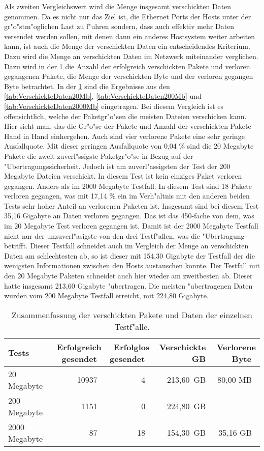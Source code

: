 Als zweiten Vergleichswert wird die Menge insgesamt verschickten Daten genommen. %
Da es nicht nur das Ziel ist, die Ethernet Ports der Hosts unter der gr"o"stm"oglichen %
Last zu f"uhren sondern, dass auch effektiv mehr Daten versendet werden sollen, mit denen dann ein anderes %
Hostsystem weiter arbeiten kann, ist auch die Menge der verschickten Daten ein entscheidendes Kriterium. Dazu wird die Menge an %
verschickten Daten im Netzwerk miteinander verglichen. Dazu wird in der \cref{tab:compPackages} %
die Anzahl der erfolgreich verschickten Pakete und verloren gegangenen Pakete, die Menge der verschickten %
Byte und der verloren gegangen Byte betrachtet. In der \cref{tab:compPackages} sind die Ergebnisse aus den %
\cref{tab:VerschickteDaten20Mb}, \cref{tab:VerschickteDaten200Mb} und \cref{tab:VerschickteDaten2000Mb} eingetragen. %
Bei diesem Vergleich ist es offensichtlich, welche der Paketgr"o"sen die meisten Dateien verschicken kann. %
Hier sieht man, das die Gr"o"se der Pakete und Anzahl der verschickten Pakete Hand in Hand einhergehen. %
Auch sind vier verlorene Pakete eine sehr geringe Ausfallquote. Mit dieser geringen Ausfallquote von 0,04 \% %
sind die 20 Megabyte Pakete die zweit zuverl"ssigste Paketgr"o"se in Bezug auf der "Ubertragungssicherheit. %
Jedoch ist am zuverl"assigsten der Test der 200 Megabyte Dateien verschickt. In diesem Test ist kein einziges Paket %
verloren gegangen. Anders als im 2000 Megabyte Testfall. In diesem Test sind 18 Pakete verloren gegangen, %
was mit 17,14 \% ein im Verh"altnis mit den anderen beiden Tests sehr hoher Anteil an verlorenen Paketen %
ist. Insgesamt sind bei diesem Test 35,16 Gigabyte an Daten verloren gegangen. Das ist das 450-fache von dem, %
was im 20 Megabyte Test verloren gegangen ist. Damit ist der 2000 Megabyte Testfall nicht nur der unzuverl"asigste %
von den drei Testf"allen, was die "Ubertragung betrifft. Dieser Testfall schneidet auch im Vergleich der Menge an verschickten Daten am %
schlechtesten ab, so ist dieser mit 154,30 Gigabyte der Testfall der die wenigsten Informationen %
zwischen den Hosts austauschen konnte. Der Testfall mit den 20 Megabyte Paketen schneidet auch hier %
wieder am zweitbesten ab. Dieser hatte insgesamt 213,60 %
Gigabyte "ubertragen. Die meisten "ubertragenen Daten wurden vom 200 Megabyte Testfall erreicht, mit 224,80 Gigabyte. %

\begin{table}
\centering
\begin{tabular}{l%
 r<{\,}%
   r<{\,}%
r<{\,GB}%
r<{\,}%
}
Tests				& Erfolgreich gesendet			& Erfolglos gesendet 	& Verschickte 	& Verlorene Byte 	\\
\hline
\hspace{8pt} 20 Megabyte  	& 10937					& 4 			& 213,60	& 80,00 MB		\\
\hspace{6pt}200 Megabyte  	& 1151					& 0			& 224,80	& --		\\
2000 Megabyte	  		& 87					& 18			& 154,30	& 35,16 GB	\\
\end{tabular}
\caption{Zusammenfassung der verschickten Pakete und Daten der einzelnen Testf"alle.}
\label{tab:compPackages}
\end{table}

